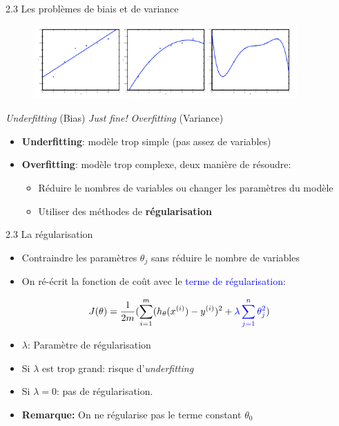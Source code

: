 \begin{frame}{2.3 Les problèmes de biais et de variance}
  \begin{figure}
    \includegraphics[width=0.9\textwidth]{fig/theProblemOfOverfitting.png}
  \end{figure}
  \footnotesize
  \vspace{-1cm}
  \begin{center}
    \textit{Underfitting} (Bias) \hspace{1.5cm} \textit{Just fine!} \hspace{1.5cm} \textit{Overfitting} (Variance)
  \end{center}
  \begin{itemize}
  \item \textbf{Underfitting}: modèle trop simple (pas assez de variables)
  \item \textbf{Overfitting}: modèle trop complexe, deux manière de résoudre:
    \begin{itemize}
    \item Réduire le nombres de variables ou changer les paramètres du modèle
    \item Utiliser des méthodes de \textbf{régularisation}
    \end{itemize}
  \end{itemize}  
\end{frame}

\begin{frame}{2.3 La régularisation}
  \begin{itemize}
  \item Contraindre les paramètres $\theta_{j}$ sans réduire le nombre de variables
  \item On ré-écrit la fonction de coût avec le \textcolor{blue}{terme de régularisation}:
  \end{itemize}
  \begin{equation*}
    J(\theta) = \frac{1}{2m}(\displaystyle\sum_{i=1}^{m}(h_{\theta}(x^{(i)}) - y^{(i)})^{2} + \textcolor{blue}{\lambda \displaystyle\sum_{j=1}^{n}\theta_{j}^{2}})
  \end{equation*}
  \begin{itemize}
  \item \boldmath $\lambda$: Paramètre de régularisation
  \item Si $\lambda$ est trop grand: risque d'\textit{underfitting}
  \item Si $\lambda = 0$: pas de régularisation. 
  \item \textbf{Remarque:} On ne régularise pas le terme constant $\theta_{0}$
  \end{itemize}
\end{frame}

